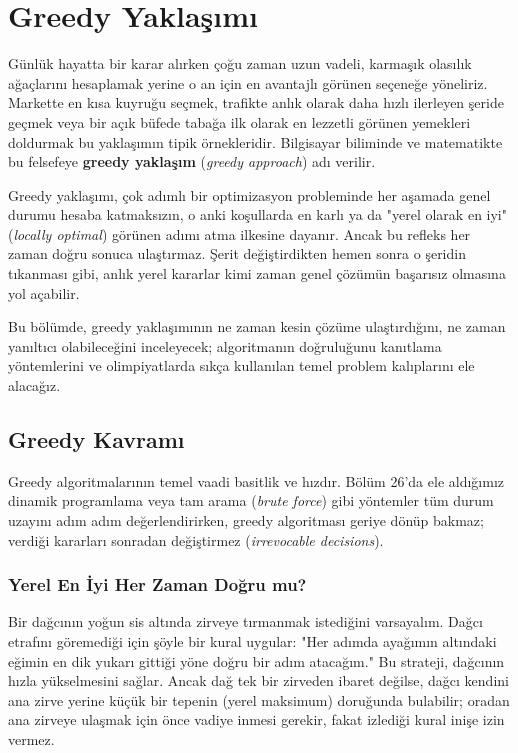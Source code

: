 \chapter[Greedy Yaklaşımı · \textit{Orta}]{Greedy Yaklaşımı}

Günlük hayatta bir karar alırken çoğu zaman uzun vadeli, karmaşık olasılık ağaçlarını hesaplamak yerine o an için en avantajlı görünen seçeneğe yöneliriz. Markette en kısa kuyruğu seçmek, trafikte anlık olarak daha hızlı ilerleyen şeride geçmek veya bir açık büfede tabağa ilk olarak en lezzetli görünen yemekleri doldurmak bu yaklaşımın tipik örnekleridir. Bilgisayar biliminde ve matematikte bu felsefeye \textbf{greedy yaklaşım} (\textit{greedy approach}) adı verilir.

Greedy yaklaşımı, çok adımlı bir optimizasyon probleminde her aşamada genel durumu hesaba katmaksızın, o anki koşullarda en karlı ya da "yerel olarak en iyi" (\textit{locally optimal}) görünen adımı atma ilkesine dayanır. Ancak bu refleks her zaman doğru sonuca ulaştırmaz. Şerit değiştirdikten hemen sonra o şeridin tıkanması gibi, anlık yerel kararlar kimi zaman genel çözümün başarısız olmasına yol açabilir.

Bu bölümde, greedy yaklaşımının ne zaman kesin çözüme ulaştırdığını, ne zaman yanıltıcı olabileceğini inceleyecek; algoritmanın doğruluğunu kanıtlama yöntemlerini ve olimpiyatlarda sıkça kullanılan temel problem kalıplarını ele alacağız.

\section{Greedy Kavramı}

Greedy algoritmalarının temel vaadi basitlik ve hızdır. Bölüm 26'da ele aldığımız dinamik programlama veya tam arama (\textit{brute force}) gibi yöntemler tüm durum uzayını adım adım değerlendirirken, greedy algoritması geriye dönüp bakmaz; verdiği kararları sonradan değiştirmez (\textit{irrevocable decisions}).

\subsection{Yerel En İyi Her Zaman Doğru mu?}

Bir dağcının yoğun sis altında zirveye tırmanmak istediğini varsayalım. Dağcı etrafını göremediği için şöyle bir kural uygular: "Her adımda ayağımın altındaki eğimin en dik yukarı gittiği yöne doğru bir adım atacağım." Bu strateji, dağcının hızla yükselmesini sağlar. Ancak dağ tek bir zirveden ibaret değilse, dağcı kendini ana zirve yerine küçük bir tepenin (yerel maksimum) doruğunda bulabilir; oradan ana zirveye ulaşmak için önce vadiye inmesi gerekir, fakat izlediği kural inişe izin vermez.

